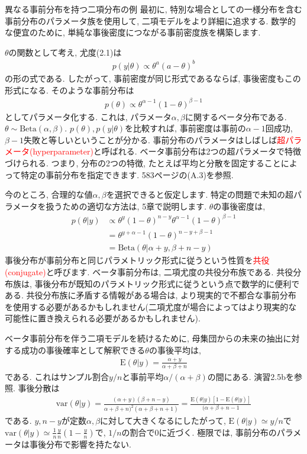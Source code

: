 \documentclass[10pt,dvipdfmx,a4]{beamer}
\newcommand{\eqn}[1]{\begin{align*}#1\end{align*}}
\newcommand{\tcr}[1]{\textcolor{red}{#1}}
\begin{document}
\begin{frame}{異なる事前分布を持つ二項分布の例}
最初に, 特別な場合としての一様分布を含む事前分布のパラメータ族を使用して, 二項モデルをより詳細に追求する.
数学的な便宜のために, 単純な事後密度につながる事前密度族を構築します.

$\theta$の関数として考え, 尤度(2.1)は
\eqn{p(y|\theta)\propto \theta^a(a-\theta)^b}
の形の式である.
したがって, 事前密度が同じ形式であるならば, 事後密度もこの形式になる.
そのような事前分布は
\eqn{p(\theta)\propto \theta^{\alpha-1}(1-\theta)^{\beta-1}}
としてパラメータ化する.
これは, パラメータ$\alpha, \beta$に関するベータ分布である.
$\theta\sim \text{Beta}(\alpha,\beta)$.
$p(\theta), p(y|\theta)$を比較すれば, 事前密度は事前の$\alpha-1$回成功, $\beta-1$失敗と等しいということが分かる.
事前分布のパラメータはしばしば\tcr{超パラメータ(hyperparameter)}と呼ばれる.
ベータ事前分布は2つの超パラメータで特徴づけられる.
つまり, 分布の2つの特徴, たとえば平均と分散を固定することによって特定の事前分布を指定できます.
583ページの(A.3)を参照.
\end{frame}


\begin{frame}
今のところ, 合理的な値$\alpha, \beta$を選択できると仮定します.
特定の問題で未知の超パラメータを扱うための適切な方法は, 5章で説明します.
$\theta$の事後密度は,
\eqn{p(\theta|y)&\propto \theta^y(1-\theta)^{n-y}\theta^{\alpha-1}(1-\theta)^{\beta-1}\\
&=\theta^{y+\alpha-1}(1-\theta)^{n-y+\beta-1}\\
&=\text{Beta}(\theta|\alpha+y,\beta+n-y)}
事後分布が事前分布と同じパラメトリック形式に従うという性質を\tcr{共役(conjugate)}と呼びます.
ベータ事前分布は, 二項尤度の共役分布族である.
共役分布族は, 事後分布が既知のパラメトリック形式に従うという点で数学的に便利である.
共役分布族に矛盾する情報がある場合は, より現実的で不都合な事前分布を使用する必要があるかもしれません(二項尤度が場合によってはより現実的な可能性に置き換えられる必要があるかもしれません).
\end{frame}


\begin{frame}
ベータ事前分布を伴う二項モデルを続けるために, 母集団からの未来の抽出に対する成功の事後確率として解釈できる$\theta$の事後平均は,
\eqn{\text{E}(\theta|y)=\frac{\alpha+y}{\alpha+\beta+n}}
である.
これはサンプル割合$y/n$と事前平均$\alpha/(\alpha+\beta)$の間にある.
演習2.5bを参照.
事後分散は
\eqn{\text{var}(\theta|y)=\frac{(\alpha+y)(\beta+n-y)}{\alpha+\beta+n)^2(\alpha+\beta+n+1)}=\frac{\text{E}(\theta|y)[1-\text{E}(\theta|y)]}{(\alpha+\beta+n-1}}
である.
$y, n-y$が定数$\alpha, \beta$に対して大きくなるにしたがって, $\text{E}(\theta|y)\simeq y/n$で$\text{var}(\theta|y)\simeq \tfrac{1}{n}\tfrac{y}{n}(1-\tfrac{y}{n})$で, $1/n$の割合で0に近づく.
極限では, 事前分布のパラメータは事後分布で影響を持たない.
\end{frame}
\end{document}

